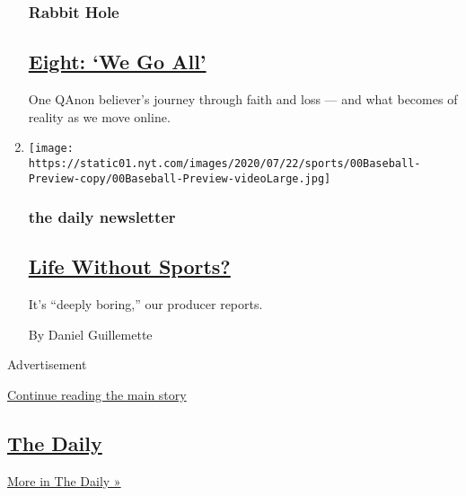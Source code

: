 \begin{enumerate}
  \hypertarget{rabbit-hole}{%
  \subsubsection{Rabbit Hole}\label{rabbit-hole}}

  \hypertarget{eight-we-go-all}{%
  \subsection{\texorpdfstring{\href{/2020/06/04/podcasts/rabbit-hole-qanon-youtube-tiktok-virus.html}{Eight:
  `We Go All'}}{Eight: `We Go All'}}\label{eight-we-go-all}}

  One QAnon believer's journey through faith and loss --- and what
  becomes of reality as we move online.
\item
  \texttt{[image: https://static01.nyt.com/images/2020/07/22/sports/00Baseball-Preview-copy/00Baseball-Preview-videoLarge.jpg]}

  \hypertarget{the-daily-newsletter}{%
  \subsubsection{the daily newsletter}\label{the-daily-newsletter}}

  \hypertarget{life-without-sports}{%
  \subsection{\texorpdfstring{\href{/2020/07/31/podcasts/daily-newsletter-baseball-season-serial.html}{Life
  Without Sports?}}{Life Without Sports?}}\label{life-without-sports}}

  It's ``deeply boring,'' our producer reports.

  By Daniel Guillemette
\end{enumerate}

Advertisement

\protect\hyperlink{after-mid1}{Continue reading the main story}

\hypertarget{the-daily-1}{%
\subsection{\texorpdfstring{\href{/column/the-daily}{The
Daily}}{The Daily}}\label{the-daily-1}}

\href{/column/the-daily}{More in The Daily »}

